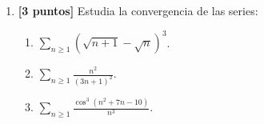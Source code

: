 \documentclass[12pt]{article}
\begin{document}
\begin{enumerate}
        \item \textbf{[3 puntos]} Estudia la convergencia de las series:
    
        \begin{enumerate}
            \item $ \displaystyle \sum_{n\geq 1} \left( \sqrt{n+1} - \sqrt{n}\right)^3$.
    
            \item $ \displaystyle \sum_{n\geq 1} \frac{n^2}{(3n+1)^2}$.
        
            \item $ \displaystyle \sum_{n\geq 1} \frac{\cos^3 (n^2 + 7n - 10)}{n^3}.
            $
        \end{enumerate}
    
        
    \end{enumerate}
\end{document}

